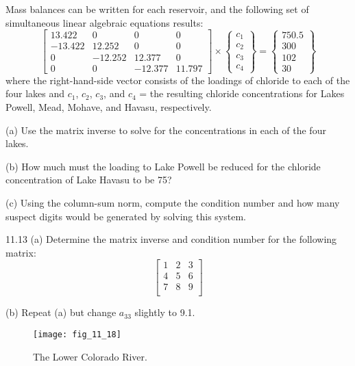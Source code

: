 \documentclass[../main.tex]{subfiles}
\begin{document}
Mass balances can be written for each reservoir, and
the following set of simultaneous linear algebraic equations
results:
\begin{equation}
\begin{bmatrix}
13.422 &0 &0 &0 \\ 
-13.422 &12.252 &0 &0 \\ 
0 &-12.252 &12.377 &0 \\ 
0 &0 &-12.377 & 11.797
\end{bmatrix}
\times 
\begin{Bmatrix}
c_{1}\\ 
c_{2}\\ 
c_{3}\\ 
c_{4}
\end{Bmatrix}
=
\begin{Bmatrix}
750.5\\
300\\
102\\
30
\end{Bmatrix}
\end{equation}
where the right-hand-side vector consists of the loadings of
chloride to each of the four lakes and $c_{1}$, $c_{2}$, $c_{3}$, and $c_{4}$ = the resulting chloride concentrations for Lakes Powell, Mead,
Mohave, and Havasu, respectively.

(a) Use the matrix inverse to solve for the concentrations in
each of the four lakes.

(b) How much must the loading to Lake Powell be reduced
for the chloride concentration of Lake Havasu to be 75?

(c) Using the column-sum norm, compute the condition
number and how many suspect digits would be generated by solving this system.


11.13 (a) Determine the matrix inverse and condition number for the following matrix:
\begin{equation}
\begin{bmatrix}
1 &2 &3 \\ 
4 &5 &6 \\ 
7 &8 &9 \\ 
\end{bmatrix}
\end{equation}

(b) Repeat (a) but change $a_{33}$ slightly to 9.1.

\begin{figure}[H]
	\centering
	\texttt{[image: fig\_11\_18]}
	\caption{\textsf{The Lower Colorado River.}}
	\label{fig:fig_11_18}
\end{figure}
\end{document}
